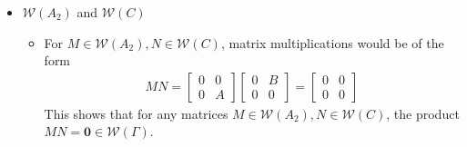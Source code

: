 \documentclass{article}
\begin{document}
\begin{itemize}
    \item $\mathcal{W}(A_2)$ and $\mathcal{W}(C)$ \\
    \begin{itemize}
        \item For $M\in\mathcal{W}(A_2),N \in \mathcal{W}(C)$, matrix multiplications would be of the form \\
        \begin{align*}
            MN = \begin{bmatrix}
                0 & 0 \\ 0 & A
            \end{bmatrix}\begin{bmatrix}
                0&B\\0&0
            \end{bmatrix} = \begin{bmatrix}
                0&0\\0&0
            \end{bmatrix}
        \end{align*}
        This shows that for any matrices $M\in\mathcal{W}(A_2),N \in \mathcal{W}(C)$, the product $MN = \mathbf{0}\in\mathcal{W}(\Gamma)$.


\end{itemize}
\end{itemize}
\end{document}
